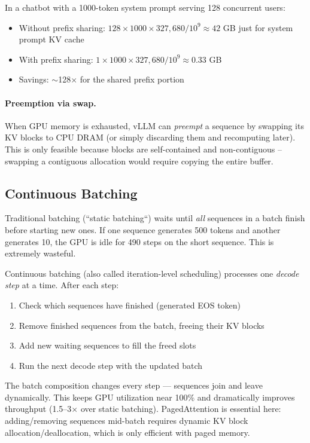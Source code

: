 \begin{intuitionbox}
In a chatbot with a 1000-token system prompt serving 128 concurrent users:

\begin{itemize}
  \item Without prefix sharing: $128 \times 1000 \times 327{,}680 / 10^9 \approx 42$ GB just for system prompt KV cache
  \item With prefix sharing: $1 \times 1000 \times 327{,}680 / 10^9 \approx 0.33$ GB
  \item Savings: $\sim$128$\times$ for the shared prefix portion
\end{itemize}
\end{intuitionbox}

\paragraph{Preemption via swap.}
\label{preemption-via-swap.}

When GPU memory is exhausted, vLLM can \emph{preempt} a sequence by swapping its KV blocks to CPU DRAM (or simply discarding them and recomputing later). This is only feasible because blocks are self-contained and non-contiguous -- swapping a contiguous allocation would require copying the entire buffer.

\subsection{Continuous Batching}
\label{continuous-batching}

Traditional batching (``static batching``) waits until \emph{all} sequences in a batch finish before starting new ones. If one sequence generates 500 tokens and another generates 10, the GPU is idle for 490 steps on the short sequence. This is extremely wasteful.

\begin{keybox}
Continuous batching (also called iteration-level scheduling) processes one \emph{decode step} at a time. After each step:

\begin{enumerate}
  \item Check which sequences have finished (generated EOS token)
  \item Remove finished sequences from the batch, freeing their KV blocks
  \item Add new waiting sequences to fill the freed slots
  \item Run the next decode step with the updated batch
\end{enumerate}

The batch composition changes every step --- sequences join and leave dynamically. This keeps GPU utilization near 100\% and dramatically improves throughput (1.5--3$\times$ over static batching). PagedAttention is essential here: adding/removing sequences mid-batch requires dynamic KV block allocation/deallocation, which is only efficient with paged memory.
\end{keybox}

